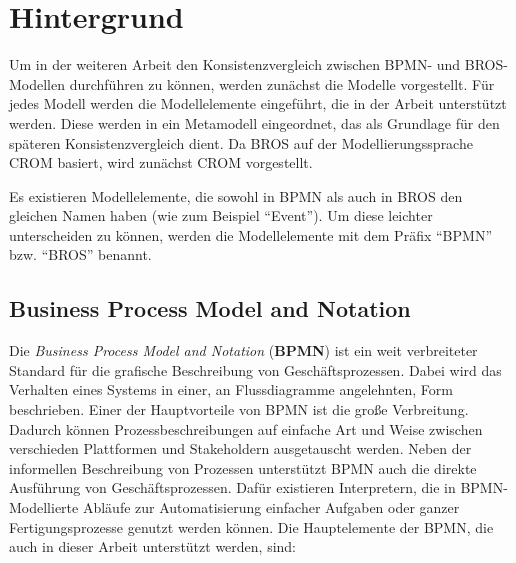 \chapter{Hintergrund}
\label{chap:background}

Um in der weiteren Arbeit den Konsistenzvergleich zwischen BPMN- und BROS-Modellen durchführen zu können, werden zunächst die Modelle vorgestellt.
Für jedes Modell werden die Modellelemente eingeführt, die in der Arbeit unterstützt werden.
Diese werden in ein Metamodell eingeordnet, das als Grundlage für den späteren Konsistenzvergleich dient.
Da BROS auf der Modellierungssprache CROM basiert, wird zunächst CROM vorgestellt.

Es existieren Modellelemente, die sowohl in BPMN als auch in BROS den gleichen Namen haben (wie zum Beispiel ``Event'').
Um diese leichter unterscheiden zu können, werden die Modellelemente mit dem Präfix ``BPMN'' bzw. ``BROS'' benannt.

\section{Business Process Model and Notation}

Die \emph{Business Process Model and Notation} (\textbf{BPMN}) ist ein weit verbreiteter Standard für die grafische Beschreibung von Geschäftsprozessen.
Dabei wird das Verhalten eines Systems in einer, an Flussdiagramme angelehnten, Form beschrieben.
Einer der Hauptvorteile von BPMN ist die große Verbreitung.
Dadurch können Prozessbeschreibungen auf einfache Art und Weise zwischen verschieden Plattformen und Stakeholdern ausgetauscht werden.
Neben der informellen Beschreibung von Prozessen unterstützt BPMN auch die direkte Ausführung von Geschäftsprozessen.
Dafür existieren Interpretern, die in BPMN-Modellierte Abläufe zur Automatisierung einfacher Aufgaben oder ganzer Fertigungsprozesse genutzt werden können.
Die Hauptelemente der BPMN, die auch in dieser Arbeit unterstützt werden, sind:

